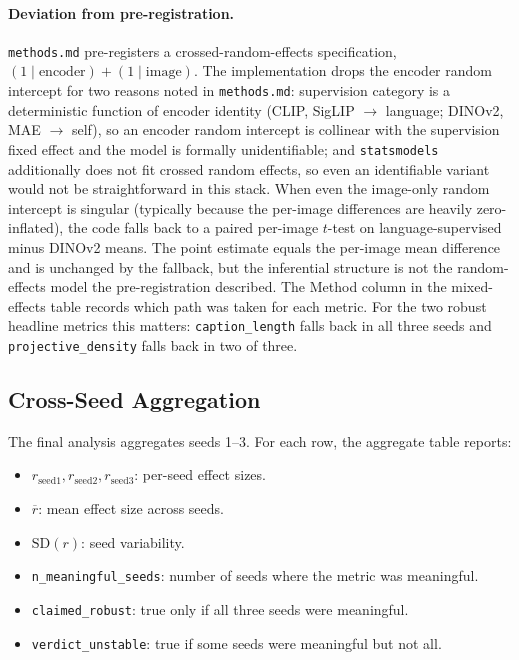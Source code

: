\documentclass[11pt]{article}
\newcommand{\code}[1]{\texttt{#1}}
\begin{document}
\paragraph{Deviation from pre-registration.} \code{methods.md} pre-registers a
crossed-random-effects specification, \((1 \mid \text{encoder}) + (1 \mid \text{image})\).
The implementation drops the encoder random intercept for two reasons noted
in \code{methods.md}: supervision category is a deterministic function of
encoder identity (CLIP, SigLIP \(\to\) language; DINOv2, MAE \(\to\) self), so an
encoder random intercept is collinear with the supervision fixed effect and
the model is formally unidentifiable; and \code{statsmodels} additionally
does not fit crossed random effects, so even an identifiable variant would
not be straightforward in this stack. When even the image-only
random intercept is singular (typically because the per-image differences are
heavily zero-inflated), the code falls back to a paired per-image \(t\)-test on
language-supervised minus DINOv2 means. The point estimate equals the per-image
mean difference and is unchanged by the fallback, but the inferential structure
is not the random-effects model the pre-registration described. The Method
column in the mixed-effects table records which path was taken for each metric.
For the two robust headline metrics this matters: \code{caption\_length} falls
back in all three seeds and \code{projective\_density} falls back in two of
three.

\subsection{Cross-Seed Aggregation}
\label{sec:agg}

The final analysis aggregates seeds 1--3. For each row, the aggregate table
reports:

\begin{itemize}
  \item \(r_{\text{seed1}}, r_{\text{seed2}}, r_{\text{seed3}}\): per-seed
  effect sizes.
  \item \(\overline{r}\): mean effect size across seeds.
  \item \(\mathrm{SD}(r)\): seed variability.
  \item \code{n\_meaningful\_seeds}: number of seeds where the metric was
  meaningful.
  \item \code{claimed\_robust}: true only if all three seeds were meaningful.
  \item \code{verdict\_unstable}: true if some seeds were meaningful but not
  all.
\end{itemize}
\end{document}
